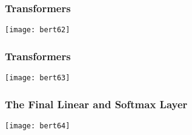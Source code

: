 \begin{frame}[fragile]\frametitle{Transformers}


			\begin{center}
			\texttt{[image: bert62]}
			\end{center}		

			
\end{frame}

\begin{frame}[fragile]\frametitle{Transformers}


			\begin{center}
			\texttt{[image: bert63]}
			\end{center}		

			
\end{frame}

\begin{frame}[fragile]\frametitle{The Final Linear and Softmax Layer}


			\begin{center}
			\texttt{[image: bert64]}
			\end{center}		

			
\end{frame}




			
